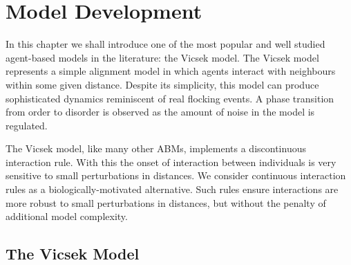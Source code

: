\graphicspath{{fig/model_development/}}

\chapter{Model Development}
\label{cha:model_dev}

In this chapter we shall introduce one of the most popular and well studied agent-based
models in the literature: the Vicsek model. The Vicsek model represents a simple alignment
model in which agents interact with neighbours within some given distance. Despite its
simplicity, this model can produce sophisticated dynamics reminiscent of real flocking
events. A phase transition from order to disorder is observed as the amount of noise in
the model is regulated.

The Vicsek model, like many other ABMs, implements a discontinuous interaction rule. With
this the onset of interaction between individuals is very sensitive to small perturbations
in distances. We consider continuous interaction rules as a biologically-motivated
alternative. Such rules ensure interactions are more robust to small perturbations in
distances, but without the penalty of additional model complexity.

\section{The Vicsek Model}

